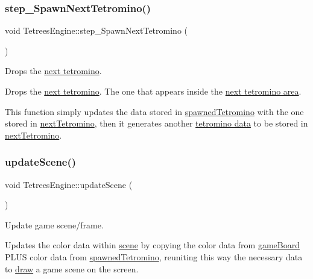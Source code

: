 \subsubsection{\texorpdfstring{step\+\_\+\+Spawn\+Next\+Tetromino()}{step\_SpawnNextTetromino()}}
{\footnotesize\ttfamily void Tetrees\+Engine\+::step\+\_\+\+Spawn\+Next\+Tetromino (\begin{DoxyParamCaption}{ }\end{DoxyParamCaption})\hspace{0.3cm}{\ttfamily [private]}}



Drops the \hyperlink{classTetreesEngine_a44c902481f5d8a72ca8a78d24f5c3a33}{next tetromino}. 

Drops the \hyperlink{classTetreesEngine_a44c902481f5d8a72ca8a78d24f5c3a33}{next tetromino}. The one that appears inside the \hyperlink{TetreesUI_8cpp_aac997784ac88b494498d6e08d6fe62d5}{next tetromino area}.

This function simply updates the data stored in \hyperlink{classTetreesEngine_a26435ee2f02d9ba70d9e359745114f6e}{spawned\+Tetromino} with the one stored in \hyperlink{classTetreesEngine_a44c902481f5d8a72ca8a78d24f5c3a33}{next\+Tetromino}, then it generates another \hyperlink{classTetreesUtils_acb377319f6772d9e88f677273c895912}{tetromino data} to be stored in \hyperlink{classTetreesEngine_a44c902481f5d8a72ca8a78d24f5c3a33}{next\+Tetromino}. \mbox{\label{classTetreesEngine_a9aa3eec9561623f77eab13298ddad13c}} 
\subsubsection{\texorpdfstring{update\+Scene()}{updateScene()}}
{\footnotesize\ttfamily void Tetrees\+Engine\+::update\+Scene (\begin{DoxyParamCaption}{ }\end{DoxyParamCaption})\hspace{0.3cm}{\ttfamily [private]}}



Update game scene/frame. 

Updates the color data within \hyperlink{classTetreesEngine_aeade477c0bc2eaaa894ebbdaca93584e}{scene} by copying the color data from \hyperlink{classTetreesEngine_a37d082a7816d6731b2703dd6d1a1cb97}{game\+Board} P\+L\+US color data from \hyperlink{classTetreesEngine_a26435ee2f02d9ba70d9e359745114f6e}{spawned\+Tetromino}, reuniting this way the necessary data to \hyperlink{classTetreesUI_a357ae7240cc5f35b5d61244e7a6bcfe3}{draw} a game scene on the screen. 

